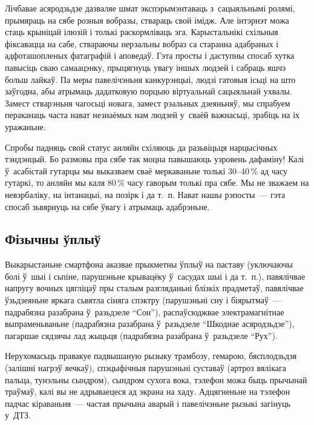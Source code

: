 Лічбавае асяродзьдзе дазваляе шмат экспэрымэнтаваць з~сацыяльнымі ролямі, прымяраць на сябе розныя вобразы, ствараць свой імідж. Але інтэрнэт можа стаць крыніцай ілюзій і толькі раскормліваць эга. Карыстальнікі схільныя фіксавацца на сабе, ствараючы нерэальны вобраз са старанна адабраных і адфоташопленых фатаграфій і аповедаў. Гэта просты і даступны спосаб хутка павысіць сваю самаацэнку, прыцягнуць увагу іншых людзей і сабраць яшчэ больш лайкаў. Па меры павелічэньня канкурэнцыі, людзі гатовыя ісьці на што заўгодна, абы атрымаць дадатковую порцыю віртуальнай сацыяльнай ухвалы. Замест стварэньня чагосьці новага, замест рэальных дзеяньняў, мы спрабуем пераканаць часта нават незнаёмых нам людзей у~сваёй важнасьці, зрабіць на іх уражаньне.

Спробы падняць свой статус анляйн схіляюць да разьвіцьця нарцысічных тэндэнцый. Бо размовы пра сябе так моцна павышаюць узровень дафаміну! Калі ў~асабістай гутарцы мы выказваем сваё меркаваньне толькі 30--40\,\% ад часу гутаркі, то анляйн мы каля 80\,\% часу гаворым толькі пра сябе. Мы не зважаем на невэрбаліку, на інтанацыі, на позірк і да т.~п. Нават нашы рэпосты~--- гэта спосаб зьвярнуць на сябе ўвагу і атрымаць адабрэньне.

\subsection*{Фізычны ўплыў}

Выкарыстаньне смартфона аказвае прыкметны ўплыў на паставу (уключаючы болі ў~шыі і сьпіне, парушэньне крывацёку ў~сасудах шыі і да т.~п.), павялічвае напругу вочных цягліцаў пры сталым разгляданьні блізкіх прадметаў, павялічвае ўзьдзеяньне яркага сьвятла сіняга спэктру (парушэньні сну і біярытмаў~--- падрабязна разабрана ў~разьдзеле ``Сон''), распаўсюджвае электрамагнітнае выпраменьваньне (падрабязна разабрана ў~разьдзеле ``Шкоднае асяродзьдзе''), пагаршае сядзячы лад жыцьця (падрабязна разабрана ў~разьдзеле ``Рух'').

Нерухомасьць правакуе падвышаную рызыку трамбозу, гемарою, бясплодзьдзя (залішні нагрэў яечкаў), спэцыфічныя парушэньні суставаў (артроз вялікага пальца, тунэльны сындром), сындром сухога вока, тэлефон можа быць прычынай траўмаў, калі вы не адрываецеся ад экрана на хаду. Адцягненьне на тэлефон падчас кіраваньня~--- частая прычына аварый і павелічэньне рызыкі загінуць у~ДТЗ.


